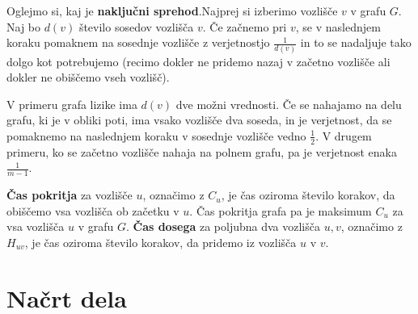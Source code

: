 \documentclass[12pt,a4paper]{amsart}
\begin{document}

Oglejmo si, kaj je \textbf{naključni sprehod}.Najprej si izberimo vozlišče $v$ v grafu $G$. Naj bo $d(v)$ število sosedov
 vozlišča $v$. Če začnemo pri $v$, se v naslednjem koraku pomaknem na 
sosednje vozlišče z verjetnostjo $\frac{1}{d(v)}$ in to se nadaljuje tako dolgo kot potrebujemo 
(recimo dokler ne pridemo nazaj v začetno vozlišče ali dokler ne obiščemo vseh vozlišč).

V primeru grafa lizike ima $d(v)$ dve možni vrednosti. Če se nahajamo na
delu grafu, ki je v obliki poti, ima vsako vozlišče dva soseda, in je verjetnost, da
se pomaknemo na naslednjem koraku v sosednje vozlišče vedno $\frac{1}{2}$. V drugem primeru, ko se začetno vozlišče nahaja na
polnem grafu, pa je verjetnost enaka $\frac{1}{m-1}$. 

\textbf{Čas pokritja} za vozlišče $u$, označimo z $C_u$, je čas oziroma število korakov, da obiščemo vsa vozlišča ob začetku v $u$.
Čas pokritja grafa pa je maksimum $C_u$ za vsa vozlišča $u$ v grafu $G$.
\textbf{Čas dosega} za poljubna dva vozlišča $u,v$, označimo z $H_{uv}$, je čas oziroma število korakov, da 
pridemo iz vozlišča $u$ v $v$.


\section{Načrt dela}
\end{document}
